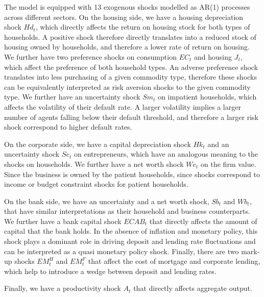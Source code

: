 \documentclass[12pt]{article}
\numberwithin{equation}{section}
\begin{document}
The model is equipped with 13 exogenous shocks modelled as AR(1) processes across different sectors. On the housing side, we have a housing depreciation shock $Hd_t$, which directly affects the return on housing stock for both types of households. A positive shock therefore directly translates into a reduced stock of housing owned by households, and therefore a lower rate of return on housing. We further have two preference shocks on consumption $EC_t$ and housing $J_t$, which affect the preference of both household types. An adverse preference shock translates into less purchasing of a given commodity type, therefore these shocks can be equivalently interpreted as risk aversion shocks to the given commodity type. We further have an uncertainty shock $Sm_t$ on impatient households, which affects the volatility of their default rate. A larger volatility implies a larger number of agents falling below their default threshold, and therefore a larger risk shock correspond to higher default rates. 

On the corporate side, we have a capital depreciation shock $Hk_t$ and an uncertainty shock $Se_t$ on entrepreneurs, which have an analogous meaning to the shocks on households. We further have a net worth shock $We_t$ on the firm value. Since the business is owned by the patient households, since shocks correspond to income or budget constraint shocks for patient households. 

On the bank side, we have an uncertainty and a net worth shock, $Sb_t$ and $Wb_t$, that have similar interpretations as their household and business counterparts. We further have a bank capital shock $ECAB_t$ that directly affects the amount of capital that the bank holds. In the absence of inflation and monetary policy, this shock plays a dominant role in driving deposit and lending rate fluctuations and can be interpreted as a quasi monetary policy shock. Finally, there are two mark-up shocks $EM^H_t$ and $EM^F_t$ that affect the cost of mortgage and corporate lending, which help to introduce a wedge between deposit and lending rates. 

Finally, we have a productivity shock $A_t$ that directly affects aggregate output. 





\end{document}
